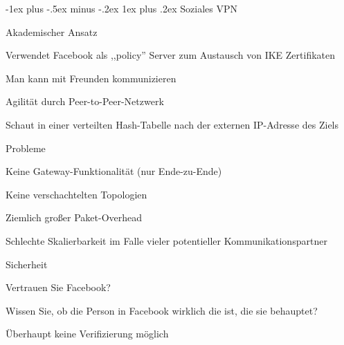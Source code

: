 \documentclass[a4paper]{article}
\makeatletter
\renewcommand{\subsubsection}{\@startsection{subsubsection}{3}{0mm}%
 {-1ex plus -.5ex minus -.2ex}%
 {1ex plus .2ex}%
 {\normalfont\small\bfseries}}
\makeatother
\begin{document}
\begin{multicols}{3}
      \subsubsection{Soziales VPN}
      \begin{itemize*}
            \item Akademischer Ansatz
            \item Verwendet Facebook als ,,policy'' Server zum Austausch von IKE Zertifikaten
            \begin{itemize*}
                  \item Man kann mit Freunden kommunizieren
            \end{itemize*}
            \item Agilität durch Peer-to-Peer-Netzwerk
            \begin{itemize*}
                  \item Schaut in einer verteilten Hash-Tabelle nach der externen IP-Adresse des Ziels
            \end{itemize*}
            \item Probleme
            \begin{itemize*}
                  \item Keine Gateway-Funktionalität (nur Ende-zu-Ende)
                  \item Keine verschachtelten Topologien
                  \item Ziemlich großer Paket-Overhead
                  \item Schlechte Skalierbarkeit im Falle vieler potentieller Kommunikationspartner
                  \item Sicherheit
                  \begin{itemize*}
                        \item Vertrauen Sie Facebook?
                        \item Wissen Sie, ob die Person in Facebook wirklich die ist, die sie behauptet?
                        \item Überhaupt keine Verifizierung möglich
                  \end{itemize*}
            \end{itemize*}
      \end{itemize*}


\end{multicols}
\end{document}
